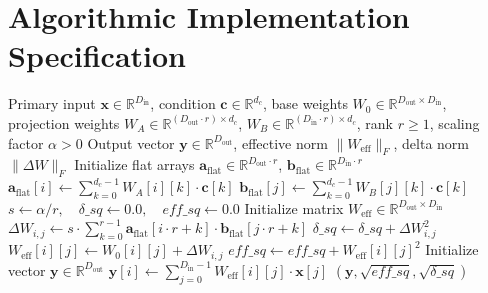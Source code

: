 \documentclass[11pt,a4paper]{article}
\theoremstyle{definition}
\begin{document}
\section{Algorithmic Implementation Specification}

\begin{algorithm}[H]
\caption{Low-Rank Factored Hypernetwork Forward Pass}
\begin{algorithmic}[1]
\Require Primary input $\mathbf{x} \in \mathbb{R}^{D_{\text{in}}}$, condition $\mathbf{c} \in \mathbb{R}^{d_c}$, base weights $W_0 \in \mathbb{R}^{D_{\text{out}} \times D_{\text{in}}}$, projection weights $W_A \in \mathbb{R}^{(D_{\text{out}} \cdot r) \times d_c}$, $W_B \in \mathbb{R}^{(D_{\text{in}} \cdot r) \times d_c}$, rank $r \ge 1$, scaling factor $\alpha > 0$
\Ensure Output vector $\mathbf{y} \in \mathbb{R}^{D_{\text{out}}}$, effective norm $\|W_{\text{eff}}\|_F$, delta norm $\|\Delta W\|_F$
\State Initialize flat arrays $\mathbf{a}_{\text{flat}} \in \mathbb{R}^{D_{\text{out}} \cdot r}$, $\mathbf{b}_{\text{flat}} \in \mathbb{R}^{D_{\text{in}} \cdot r}$
 
    \State $\mathbf{a}_{\text{flat}}[i] \gets \sum_{k=0}^{d_c-1} W_A[i][k] \cdot \mathbf{c}[k]$
\EndFor
{} 
    \State $\mathbf{b}_{\text{flat}}[j] \gets \sum_{k=0}^{d_c-1} W_B[j][k] \cdot \mathbf{c}[k]$
\EndFor
\State $s \gets \alpha / r, \quad \delta\_sq \gets 0.0, \quad eff\_sq \gets 0.0$
\State Initialize matrix $W_{\text{eff}} \in \mathbb{R}^{D_{\text{out}} \times D_{\text{in}}}$
 
        \State $\Delta W_{i, j} \gets s \cdot \sum_{k=0}^{r-1} \mathbf{a}_{\text{flat}}[i \cdot r + k] \cdot \mathbf{b}_{\text{flat}}[j \cdot r + k]$
        \State $\delta\_sq \gets \delta\_sq + \Delta W_{i, j}^2$
        \State $W_{\text{eff}}[i][j] \gets W_0[i][j] + \Delta W_{i, j}$
        \State $eff\_sq \gets eff\_sq + W_{\text{eff}}[i][j]^2$
    \EndFor
\EndFor
\State Initialize vector $\mathbf{y} \in \mathbb{R}^{D_{\text{out}}}$
 
    \State $\mathbf{y}[i] \gets \sum_{j=0}^{D_{\text{in}}-1} W_{\text{eff}}[i][j] \cdot \mathbf{x}[j]$
\EndFor
\State \Return $(\mathbf{y}, \sqrt{eff\_sq}, \sqrt{\delta\_sq})$
\end{algorithmic}
\end{algorithm}
\end{document}
